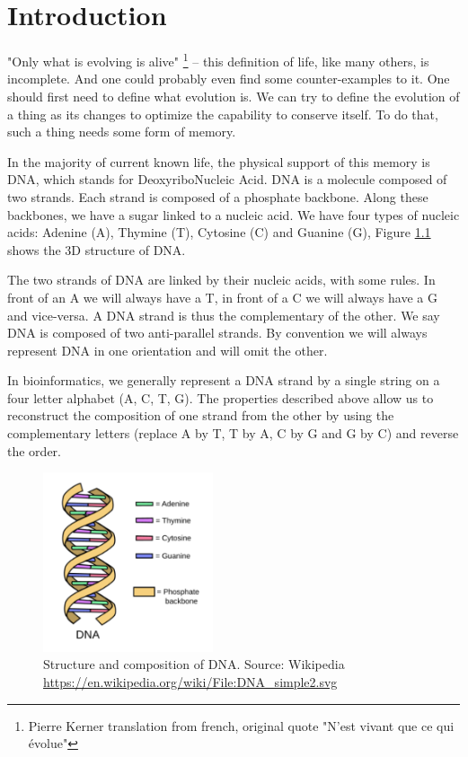 \documentclass[./main.tex]{subfiles}
\begin{document}
\chapter{Introduction}\label{chapter:introduction}

"Only what is evolving is alive" \footnote{Pierre Kerner translation from french, original quote "N'est vivant que ce qui évolue"} -- this definition of life, like many others, is incomplete. And one could probably even find some counter-examples to it. One should first need to define what evolution is. We can try to define the evolution of a thing as its changes to optimize the capability to conserve itself. To do that, such a thing needs some form of memory.

In the majority of current known life, the physical support of this memory is DNA, which stands for DeoxyriboNucleic Acid. DNA is a molecule composed of two strands. Each strand is composed of a phosphate backbone. Along these backbones, we have a sugar linked to a nucleic acid. We have four types of nucleic acids: Adenine (A), Thymine (T), Cytosine (C) and Guanine (G), Figure \ref{intro:fig:dna_rna_pres} shows the 3D structure of DNA.

The two strands of DNA are linked by their nucleic acids, with some rules. In front of an A we will always have a T, in front of a C we will always have a G and vice-versa. A DNA strand is thus the complementary of the other. %
We say DNA is composed of two anti-parallel strands. By convention we will always represent DNA in one orientation and will omit the other.

In bioinformatics, we generally represent a DNA strand by a single string on a four letter alphabet (A, C, T, G). The properties described above allow us to reconstruct the composition of one strand from the other by using the complementary letters (replace A by T, T by A, C by G and G by C) and reverse the order.%

\begin{figure}[ht]
    \centering
    \includegraphics[width=5cm]{introduction/images/DNA.pdf}
    \caption{Structure and composition of DNA. Source: Wikipedia \protect\url{https://en.wikipedia.org/wiki/File:DNA_simple2.svg}}
    \label{intro:fig:dna_rna_pres}
\end{figure}
\end{document}
